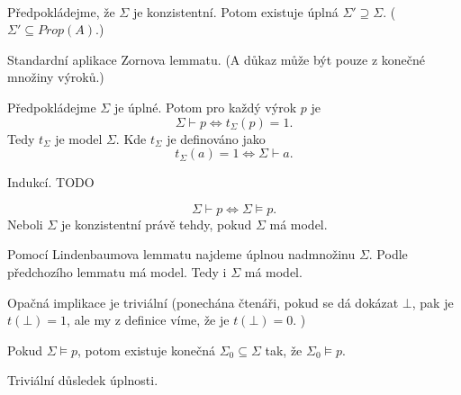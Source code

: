 \documentclass[12pt]{article}                   %
\begin{document}
        \begin{veta}[O úplnosti]
            \ \\[-3em]
            
            \begin{lemmain}[Lindenbaum]
                Předpokládejme, že $\Sigma$ je konzistentní. Potom existuje úplná $\Sigma' \supseteq \Sigma$. ($\Sigma' \subseteq Prop(A)$.)

                \begin{dukazin}
                    Standardní aplikace Zornova lemmatu. (A důkaz může být pouze z konečné množiny výroků.)
                \end{dukazin}
            \end{lemmain}
        
            \begin{lemmain}
                Předpokládejme $\Sigma$ je úplné. Potom pro každý výrok $p$ je
                $$ \Sigma \vdash p \Leftrightarrow t_\Sigma(p) = 1. $$
                Tedy $t_\Sigma$ je model $\Sigma$. Kde $t_\Sigma$ je definováno jako
                $$ t_\Sigma(a) = 1 \Leftrightarrow \Sigma \vdash a. $$

                \begin{dukazin}
                    Indukcí. TODO
                \end{dukazin}
            \end{lemmain}
            
            $$ \Sigma \vdash p \Leftrightarrow \Sigma \models p. $$
            Neboli $\Sigma$ je konzistentní právě tehdy, pokud $\Sigma$ má model.

            \begin{dukazin}
                Pomocí Lindenbaumova lemmatu najdeme úplnou nadmnožinu $\Sigma$. Podle předchozího lemmatu má model. Tedy i $\Sigma$ má model.

                Opačná implikace je triviální (ponechána čtenáři, pokud se dá dokázat $\bot$, pak je $t(\bot) = 1$, ale my z definice víme, že je $t(\bot) = 0$. \lightning)
            \end{dukazin}
        \end{veta}

        \begin{veta}[O kompaktnosti]
            Pokud $\Sigma \models p$, potom existuje konečná $\Sigma_0 \subseteq \Sigma$ tak, že $\Sigma_0 \models p$.

            \begin{dukazin}
                Triviální důsledek úplnosti.
            \end{dukazin}
        \end{veta}
\end{document}
